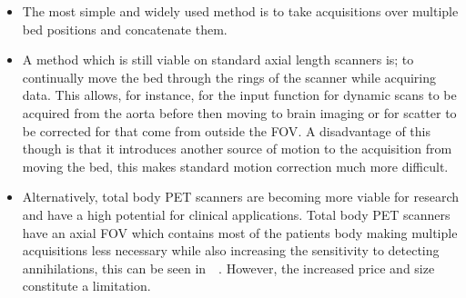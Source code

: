                 \begin{itemize}
                    \item The most simple and widely used method is to take acquisitions over multiple bed positions and concatenate them.
                    
                    \item A method which is still viable on standard axial length scanners is; to continually move the bed through the rings of the scanner while acquiring data. This allows, for instance, for the input function for dynamic scans to be acquired from the aorta before then moving to brain imaging or for scatter to be corrected for that come from outside the \gls{FOV}. A disadvantage of this though is that it introduces another source of motion to the acquisition from moving the bed, this makes standard motion correction much more difficult.
                    
                    \item Alternatively, total body \gls{PET} scanners are becoming more viable for research and have a high potential for clinical applications. Total body \gls{PET} scanners have an axial \gls{FOV} which contains most of the patients body making multiple acquisitions less necessary while also increasing the sensitivity to detecting annihilations, this can be seen in~~. However, the increased price and size constitute a limitation.
                \end{itemize}
            
